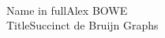 \documentclass[a4paper,11pt]{article}
\begin{document}
\pagestyle{empty}
\thispagestyle{fancy}
\fontsize{13}{15.6}\selectfont
\vspace*{-.35cm}
\hspace*{\fill}\\[2ex]

\noindent Name in full\quad Alex BOWE\\[1ex]

\noindent Title\quad Succinct de Bruijn Graphs\\


\end{document}
